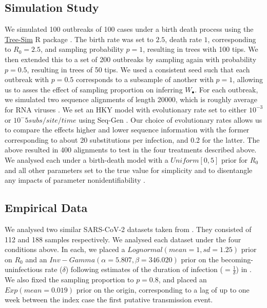 \documentclass{article}
\begin{document}
\subsection*{Simulation Study}
We simulated 100 outbreaks of 100 cases under a birth death process using the \url{Tree-Sim} R package \citep{TreeSim}. The birth rate was set to $2.5$, death rate $1$, corresponding to $R_{0} = 2.5$, and sampling probability $p=1$, resulting in trees with 100 tips. We then extended this to a set of 200 outbreaks by sampling again with probability $p=0.5$, resulting in trees of 50 tips. We used a consistent seed such that each outbreak with $p=0.5$ corresponds to a subsample of another with $p=1$, allowing us to asses the effect of sampling proportion on inferring $W_{\bullet}$. For each outbreak, we simulated two sequence alignments of length 20000, which is roughly average for RNA viruses \citep{sanjuan2010viral}. We set an HKY model with evolutionary rate set to either $10^{-3}$ or $10^-{5} subs/site/time$ using Seq-Gen \cite{rambaut_seq-gen_1997}.  Our choice of evolutionary rates allows us to compare the effects higher and lower sequence information with the former corresponding to about 20 substitutions per infection, and 0.2 for the latter. 
The above resulted in 400 alignments to test in the four treatments described above. We analysed each under a birth-death model with a $Uniform[0,5]$ prior for $R_0$ and all other parameters set to the true value for simplicity and to disentangle any impacts of parameter nonidentifiability \citep{louca2021fundamental}.
\subsection*{Empirical Data}
We analysed two similar SARS-CoV-2 datasets taken from \citep{lane2021genomics}. They consisted of 112 and 188 samples respectively. We analysed  each dataset under the four conditions above. In each, we placed a $Lognormal(mean=1, sd=1.25)$ prior on $R_0$ and an $Inv-Gamma(\alpha=5.807, \beta=346.020)$ prior on the becoming-uninfectious rate ($\delta$) following estimates of the duration of infection ($=\frac{1}{\delta}$) in \cite{Lauer2020The}. We also fixed the sampling proportion to $p=0.8$, and placed an $Exp(mean=0.019)$ prior on the origin, corresponding to a lag of up to one week  between the index case the first putative transmission event. 
\end{document}
